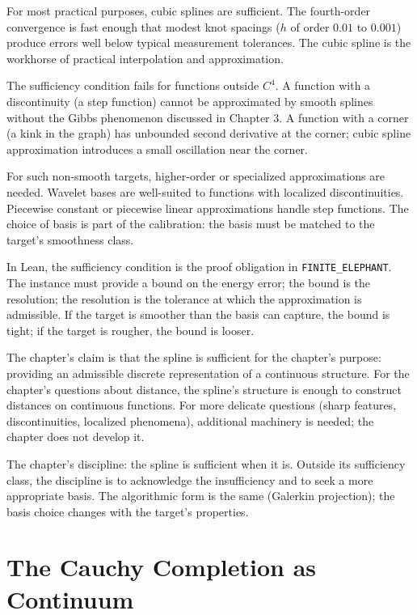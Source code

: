 For most practical purposes, cubic splines are sufficient. The
fourth-order convergence is fast enough that modest knot spacings
($h$ of order $0.01$ to $0.001$) produce errors well below typical
measurement tolerances. The cubic spline is the workhorse of
practical interpolation and approximation.

The sufficiency condition fails for functions outside $C^4$. A
function with a discontinuity (a step function) cannot be
approximated by smooth splines without the Gibbs phenomenon
discussed in Chapter 3. A function with a corner (a kink in the
graph) has unbounded second derivative at the corner; cubic spline
approximation introduces a small oscillation near the corner.

For such non-smooth targets, higher-order or specialized
approximations are needed. Wavelet bases are well-suited to
functions with localized discontinuities. Piecewise constant or
piecewise linear approximations handle step functions. The choice
of basis is part of the calibration: the basis must be matched to
the target's smoothness class.

In Lean, the sufficiency condition is the proof obligation in
\texttt{FINITE\_ELEPHANT}. The instance must provide a bound on the
energy error; the bound is the resolution; the resolution is the
tolerance at which the approximation is admissible. If the target
is smoother than the basis can capture, the bound is tight; if the
target is rougher, the bound is looser.

The chapter's claim is that the spline is sufficient for the
chapter's purpose: providing an admissible discrete representation
of a continuous structure. For the chapter's questions about
distance, the spline's structure is enough to construct distances
on continuous functions. For more delicate questions (sharp
features, discontinuities, localized phenomena), additional
machinery is needed; the chapter does not develop it.

The chapter's discipline: the spline is sufficient when it is.
Outside its sufficiency class, the discipline is to acknowledge
the insufficiency and to seek a more appropriate basis. The
algorithmic form is the same (Galerkin projection); the basis
choice changes with the target's properties.

\section{The Cauchy Completion as Continuum}
\label{se:the-cauchy-completion-as-continuum}

